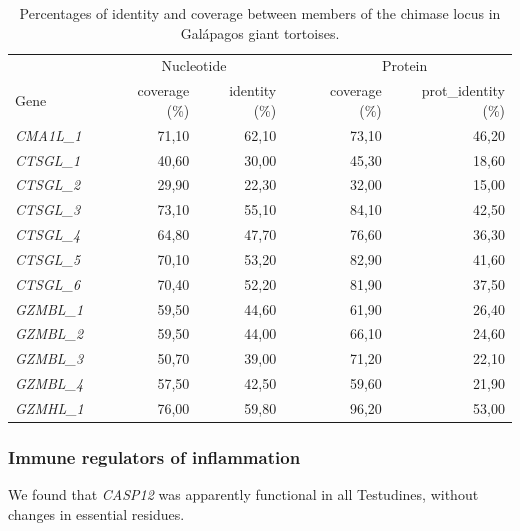\begin{table}[h]
    \centering
    \caption[Percentages of identity and coverage in granzymes]{\footnotesize Percentages of identity and coverage between members of the chimase locus in Gal\'{a}pagos giant tortoises.}
    \begin{tabular}{lrrrrrr}
        \hline \hline
        \multicolumn{1}{l}{} & & \multicolumn{2}{c}{Nucleotide} & & \multicolumn{2}{c}{Protein} \\
        \cline{3-4} \cline{6-7}
        Gene & & coverage (\%) & identity (\%) & & coverage (\%) & prot\_identity (\%) \\\hline \hline
        \textit{CMA1L\_1} & & 71,10 & 62,10 & & 73,10 & 46,20 \\
        \textit{CTSGL\_1} & & 40,60 & 30,00 & & 45,30 & 18,60 \\
        \textit{CTSGL\_2} & & 29,90 & 22,30 & & 32,00 & 15,00 \\
        \textit{CTSGL\_3} & & 73,10 & 55,10 & & 84,10 & 42,50 \\
        \textit{CTSGL\_4} & & 64,80 & 47,70 & & 76,60 & 36,30 \\
        \textit{CTSGL\_5} & & 70,10 & 53,20 & & 82,90 & 41,60 \\
        \textit{CTSGL\_6} & & 70,40 & 52,20 & & 81,90 & 37,50 \\
        \textit{GZMBL\_1} & & 59,50 & 44,60 & & 61,90 & 26,40 \\
        \textit{GZMBL\_2} & & 59,50 & 44,00 & & 66,10 & 24,60 \\
        \textit{GZMBL\_3} & & 50,70 & 39,00 & & 71,20 & 22,10 \\
        \textit{GZMBL\_4} & & 57,50 & 42,50 & & 59,60 & 21,90 \\
        \textit{GZMHL\_1} & & 76,00 & 59,80 & & 96,20 & 53,00 \\ \hline \hline
    \end{tabular}
    \label{t_results_george_degradome_granzymes}
\end{table}

\subsubsection{Immune regulators of inflammation} \label{sss_results_george_degradome_immunology_inflammation}

We found that \textit{CASP12} was apparently functional in all Testudines, without changes in essential residues.

